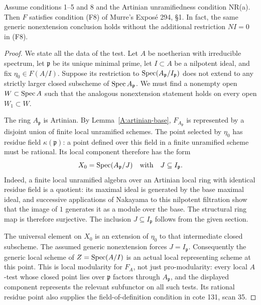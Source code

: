\begin{proposition}\label{A:Murre-F8}
Assume conditions 1--5 and 8 and the Artinian unramifiedness condition
NR(a). Then $F$ satisfies condition (F8) of Murre's Expos\'e 294,
\S1. In fact, the same generic nonextension conclusion holds without
the additional restriction $NI=0$ in (F8).
\end{proposition}
\begin{proof}
We state all the data of the test. Let $A$ be noetherian with
irreducible spectrum, let $\mathfrak p$ be its unique minimal prime,
let $I\subset A$ be a nilpotent ideal, and fix
$\eta_0\in F(A/I)$. Suppose its restriction to
$\operatorname{Spec}(A_{\mathfrak p}/I_{\mathfrak p})$ does not extend to any
strictly larger closed subscheme of $\operatorname{Spec} A_{\mathfrak p}$.
We must find a nonempty open $W\subset\operatorname{Spec} A$ such that the
analogous nonextension statement holds on every open $W_1\subset W$.

The ring $A_{\mathfrak p}$ is Artinian. By
Lemma~\ref{A:artinian-base}, $F_{A_{\mathfrak p}}$ is represented by
a disjoint union of finite local unramified schemes. The point
selected by $\eta_0$ has residue field $\kappa(\mathfrak p)$: a
point defined over this field in a finite unramified scheme must be
rational. Its local component therefore has the form
\[
 X_0=\operatorname{Spec}(A_{\mathfrak p}/J)
 \quad\text{with}\quad J\subseteq I_{\mathfrak p}.
\]
Indeed, a finite local unramified algebra over an Artinian local
ring with identical residue field is a quotient: its maximal ideal
is generated by the base maximal ideal, and successive applications
of Nakayama to this nilpotent filtration show that the image of $1$
generates it as a module over the base. The structural ring map is
therefore surjective. The inclusion $J\subseteq I_{\mathfrak p}$
follows from the given section.

The universal element on $X_0$ is an extension of $\eta_0$ to
that intermediate closed subscheme. The assumed generic
nonextension forces $J=I_{\mathfrak p}$. Consequently the generic
local scheme of $Z=\operatorname{Spec}(A/I)$ is an actual local representing
scheme at this point. This is local modularity for $F_A$, not just
pro-modularity: every local $A$-test whose closed point lies over
$\mathfrak p$ factors through $A_{\mathfrak p}$, and the displayed
component represents the relevant subfunctor on all such tests.
Its rational residue point also supplies the field-of-definition
condition in cote 131, scan 35.


\end{proof}

